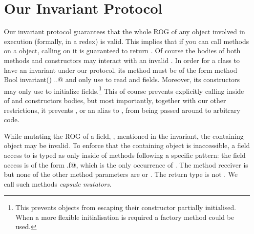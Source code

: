 



\section{Our Invariant Protocol}
\label{s:validate}
Our invariant protocol guarantees that the whole ROG of any object involved in execution (formally, in a redex) is valid.
This implies that if you can call methods on a object, calling \Q@invariant@ on it is guaranteed to return \Q@true@.
Of course the bodies of both \Q@invariant@ methods and constructors may interact with an invalid \Q@this@.
In order for a class to have an invariant under our protocol,
its \Q@invariant@ method must be of the form \Q@read method Bool invariant() {..}@
and only use \Q@this@ to read \Q@imm@ and \Q@capsule@ fields.
Moreover, its constructors may only use \Q@this@ to initialize fields.\footnote{This prevents objects from escaping their constructor partially initialised.
When a more flexible initialisation is required
a factory method could be used.}
This of course prevents explicitly calling \Q@invariant@ inside of \Q@invariants@ and constructors bodies, but most importantly, together with our other restrictions, it prevents \Q@this@, or an alias to \Q@this@, from being passed around to arbitrary code.


While mutating the ROG of a \Q@capsule@ field, \Q@f@, mentioned in the invariant, the containing object may be invalid.
To enforce that the containing object is inaccessible, 
a field access to \Q@f@ is typed as \Q@mut@ only inside of methods following a specific pattern:
 the field access is of the form \Q@this.f@, which is the only occurrence of \Q@this@.
 The method receiver is \Q@mut@ but none of the other method parameters are \Q@mut@ or \Q@read@.
 The return type is not \Q@mut@.
We call such methods \emph{capsule mutators}.

